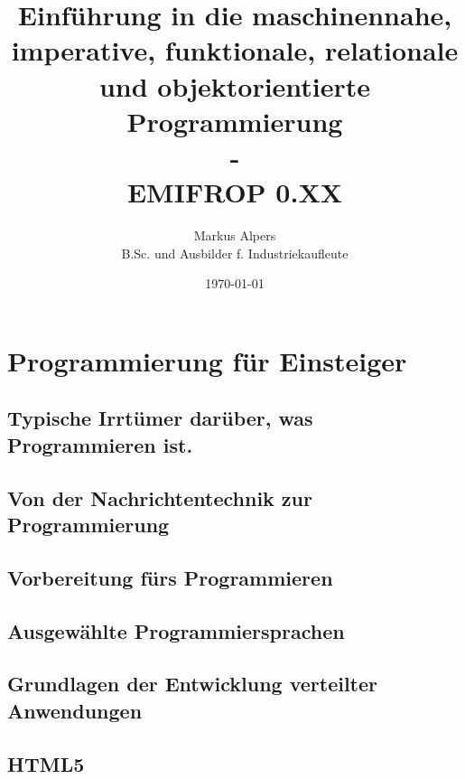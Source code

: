 \documentclass[11pt, a4paper, oneside, draft]{book}
\begin{document}

\title{Einführung in die maschinennahe, imperative, funktionale, relationale und objektorientierte Programmierung\\-\\EMIFROP 0.XX}
\author{Markus Alpers\\B.Sc. und Ausbilder f. Industriekaufleute}
\date{\today}

\maketitle


\tableofcontents


%

\part{Programmierung für Einsteiger}

%
\chapter[Das ist Programmieren (wirklich)]{Typische Irrtümer darüber, was Programmieren ist.}
%
\chapter[Nachrichtentechnik und Programmierung]{Von der Nachrichtentechnik zur Programmierung}
%
\chapter{Vorbereitung fürs Programmieren}
%
\chapter{Ausgewählte Programmiersprachen}

%
\chapter[Grundlagen verteilter Anwendungen]{Grundlagen der Entwicklung verteilter Anwendungen}
%
\chapter{HTML5}
%
\end{document}
